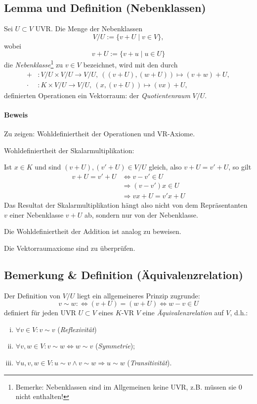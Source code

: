  \subsection{Lemma und Definition (Nebenklassen)}
 	\begin{Definition}[Nebenklassen]
 		Sei $U\subset V$ UVR. Die Menge der Nebenklassen
 		\[
 			V/U := \{v+U\mid v\in V\},
 		\]
 		wobei
 		\[
 			v+U:=\{v+u\mid u\in U\}
 		\]
 		die \emph{Nebenklasse}\footnote{Bemerke: Nebenklassen sind im Allgemeinen keine UVR, z.B. müssen sie $0$ nicht enthalten!} zu $v\in V$ bezeichnet, wird mit den durch
 		\begin{align*}
 			+     & : V/U \times V/U \to V/U,\ ((v+U),(w+U))\mapsto (v+w)+U, \\
 			\cdot & : K\times V/U \to V/U,\ (x,(v+U))\mapsto (vx)+U,
 		\end{align*}
 		definierten Operationen ein Vektorraum: der \emph{Quotientenraum} $V/U$.
 	\end{Definition}

 	\paragraph{Beweis}
 		Zu zeigen: Wohldefiniertheit der Operationen und VR-Axiome.

 		Wohldefiniertheit der Skalarmultiplikation:

 		Ist $x\in K$ und sind $(v+U),(v'+U)\in V/U$ gleich, also $v+U = v'+U$, so gilt
 		\begin{align*}
 			v+U = v'+U & \Leftrightarrow v - v'\in U \\
 			           & \Rightarrow (v-v')x \in U   \\
 			           & \Rightarrow vx+U=v' x+U
 		\end{align*}
 		Das Resultat der Skalarmultiplikation hängt also nicht von dem Repräsentanten $v$ einer Nebenklasse $v+U$ ab, sondern nur von der Nebenklasse.

 		Die Wohldefiniertheit der Addition ist analog zu beweisen.

 		Die Vektorraumaxiome sind zu überprüfen.

 \subsection{Bemerkung \& Definition (Äquivalenzrelation)}
 	\begin{Definition}[Äquivalenzrelation]
 		Der Definition von $ V/U $ liegt ein allgemeineres Prinzip zugrunde:
 		\[
 			v\sim w :\Leftrightarrow (v+U)= (w+U) \Leftrightarrow w-v \in U
 		\]
 		definiert für jeden UVR $ U\subset V $ eines $ K $-VR $ V $ eine \emph{Äquivalenzrelation} auf $ V $, d.h.:
 		\begin{enumerate}[(i)]
 			\item $ \forall v\in V: v\sim v $ (\emph{Reflexivität})
 			\item $ \forall v,w\in V: v\sim w\Leftrightarrow w\sim v $ (\emph{Symmetrie});
 			\item $ \forall u,v,w\in V: u\sim v\land v\sim w\Rightarrow u\sim w $ (\emph{Transitivität}).
 		\end{enumerate}
 	\end{Definition}

